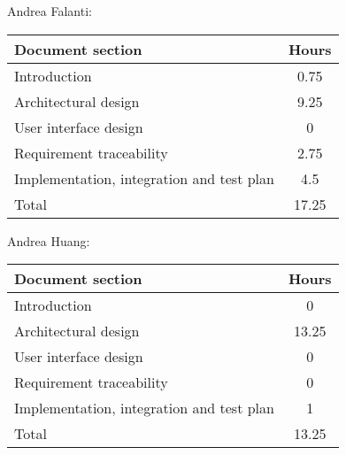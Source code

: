 Andrea Falanti:

\begin{tabular}{|l|c|}
    \hline
    Document section & Hours \\
    \hline
     Introduction & 0.75\\
     Architectural design & 9.25\\
     User interface design & 0\\
     Requirement traceability & 2.75\\
     Implementation, integration and test plan & 4.5\\
     \hline
     Total & 17.25\\
     \hline
\end{tabular}
\vskip 0.3in

Andrea Huang:

\begin{tabular}{|l|c|}
    \hline
    Document section & Hours \\
    \hline
     Introduction & 0\\
     Architectural design & 13.25\\
     User interface design & 0\\
     Requirement traceability & 0\\
     Implementation, integration and test plan & 1\\
     \hline
     Total & 13.25\\
     \hline
\end{tabular}